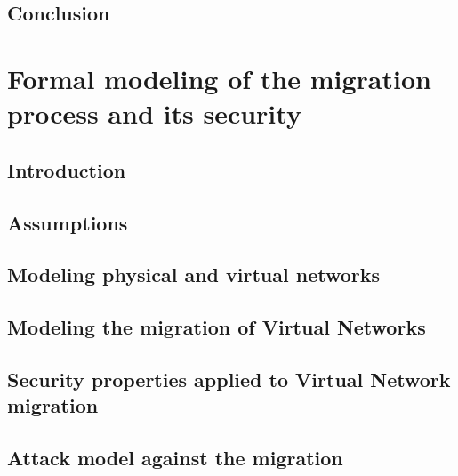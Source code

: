 \documentclass[a4paper, 11pt]{article}
\begin{document}
% 



\subsection{Conclusion}


\newpage
\section{Formal modeling of the migration process and its security}
\label{sec:formal_model}
\subsection{Introduction}


% 

\subsection{Assumptions}


\subsection{Modeling physical and virtual networks}


\subsection{Modeling the migration of Virtual Networks}


\subsection{Security properties applied to Virtual Network migration}


\subsection{Attack model against the migration}

\end{document}

